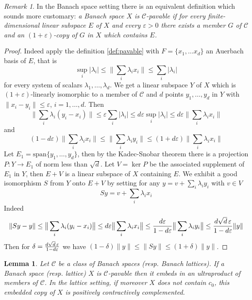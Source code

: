 \documentclass[11pt]{amsart}
\theoremstyle{plain}
\newtheorem{lemma}[theorem]{Lemma}
\theoremstyle{remark}
\newtheorem{remark}[theorem]{Remark}
\newcommand{\C}{\mathcal C}
\newcommand{\eps}{\varepsilon}
\begin{document}
\begin{remark}
In the Banach space setting there is an equivalent definition which sounds more customary:
{\it a Banach space $X$ is $\C$-pavable if for every  finite-dimensional linear subspace $E$ of $X$ and every $\eps>0$ there exists a member $G$ of $\C$ and an $(1+\eps)$-copy of $G$ in $X$ which contains $E$.}
\end{remark}
\begin{proof}
Indeed apply the definition \ref {def:pavable} with $F=\{x_1,\dots x_d\}$ an Auerbach basis of $E$, that is
\[ \sup_i|\lambda_i|\le \big\|\sum_i\lambda_i x_i\big\|\le \sum_i |\lambda_i|\]
for every system of scalars $\lambda_1,\dots,\lambda_d$.  We get a linear subspace $Y$ of $X$ which is $(1+\eps)$-linearly isomorphic to a member of $\C$ and $d$ points $y_1,\dots, y_d$ in $Y$ with $\|x_i-y_i\|\le \eps$, $i=1,\dots, d$. Then
\[\big\| \sum_i \lambda_i(y_i-x_i)\big\|\le \eps \sum_i |\lambda_i|\le d\eps\sup_i |\lambda_i|\le d\eps \big\| \sum_i \lambda_ix_i\big\|
\]
and
\[ (1-d\eps)\big\| \sum_i \lambda_ix_i\big\| \le  \big\| \sum_i \lambda_iy_i\big\|\le (1+d\eps)\big\| \sum_i \lambda_ix_i\big\|
\]
Let $E_1=\mathrm{span}\{y_1,\dots,y_d\}$, then by the Kadec-Snobar theorem there is a projection $P:Y\to E_1$ of norm less than $\sqrt d$. Let $V=\ker P$ be the associated supplement of $E_1$ in $Y$, then $E+V$
is a linear subspace of $X$ containing $E$. We exhibit a good isomorphism $S$ from $Y$ onto $E+V$ by setting for any $y=v+\sum_i\lambda_i y_i$ with  $v\in V$ 
\[ Sy=v+\sum_i\lambda_i x_i \]
Indeed
\[\|Sy-y\|\le \big\| \sum_i \lambda_i(y_i-x_i)\big\|\le d\eps\big\| \sum_i \lambda_ix_i\big\| \le {d\eps\over 1-d\eps}\big\| \sum_i \lambda_iy_i\big\| \le {d\sqrt d\,\eps\over 1-d\eps}\|y\|
\]
Then for $\delta={d\sqrt d\,\eps\over 1-d\eps}$ we have $(1-\delta)\|y\|\le \|Sy\|\le (1+\delta)\|y\|$.
\end{proof}


\begin{lemma}\label{embedding}
Let $\C$ be a class of Banach spaces (resp. Banach lattices). If a Banach space (resp. lattice) $X$ is $\C$-pavable then it embeds in an ultraproduct of members of $\C$. In the lattice setting, if moreover $X$ does not contain $c_0$, this embedded copy of $X$ is positively contractively complemented.
\end{lemma}
\end{document}

